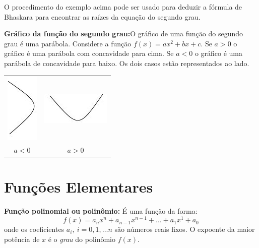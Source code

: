 O procedimento do exemplo acima pode ser usado para deduzir a fórmula de Bhaskara para encontrar
as raízes da equação do segundo grau.


\begin{multicols}{2}

\noindent \textbf{Gráfico da função do segundo grau:}O gráfico de uma função do segundo grau é uma parábola. Considere a função
$f(x)=ax^2+bx+c$. Se $a>0$ o gráfico é uma parábola com concavidade para cima. Se $a<0$ o gráfico é uma parábola de concavidade para baixo. Os dois casos estão representados ao lado.

\columnbreak


\begin{center}
\begin{tabular}{cc}
\includegraphics{./chapters/preliminares/imgs/SadHappy.jpg} & \includegraphics{./chapters/preliminares/imgs/Happy.jpg} \\
$a<0$ & $a>0$
\end{tabular}
\end{center}
\end{multicols}

\section{Funções Elementares}


\noindent\textbf{Função polinomial ou polinômio:}  É uma função da forma:
\begin{equation}\label{polinomio}f(x)=a_nx^n+a_{n-1}x^{n-1}+\ldots+a_1x^{1}+a_0\end{equation}
onde os coeficientes $a_i,\ i=0,1,\ldots n$ são números reais fixos. O expoente da maior potência de $x$ é o \textit{grau} do polinômio $f(x)$.

